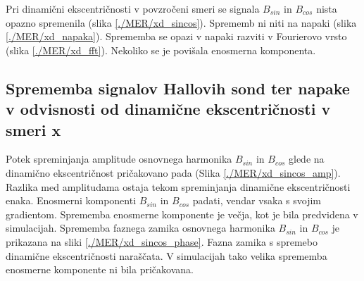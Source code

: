 Pri dinamični ekscentričnosti v povzročeni smeri se signala $B_{sin}$ in $B_{cos}$ nista opazno spremenila (slika \ref{./MER/xd_sincos}). Sprememb ni niti na napaki (slika \ref{./MER/xd_napaka}). Sprememba se opazi v  napaki razviti v Fourierovo vrsto (slika \ref{./MER/xd_fft}). Nekoliko se je povišala enosmerna komponenta.
\subsection{Sprememba signalov Hallovih sond ter napake v odvisnosti od dinamične ekscentričnosti v smeri x}

Potek spreminjanja amplitude osnovnega harmonika $B_{sin}$ in $B_{cos}$ glede na dinamično ekscentričnost pričakovano pada (Slika \ref{./MER/xd_sincos_amp}). Razlika med amplitudama ostaja tekom spreminjanja dinamične ekscentričnosti enaka. Enosmerni komponenti $B_{sin}$ in $B_{cos}$ padati, vendar vsaka s svojim gradientom. Sprememba enosmerne komponente je večja, kot je bila predvidena v simulacijah. Sprememba faznega zamika osnovnega harmonika $B_{sin}$ in $B_{cos}$ je prikazana na sliki \ref{./MER/xd_sincos_phase}. Fazna zamika s spremebo dinamične ekscentričnosti naraščata. V simulacijah tako velika sprememba enosmerne komponente ni bila pričakovana.

